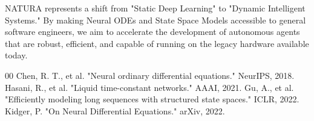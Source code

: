 \documentclass[journal]{IEEEtran}
\begin{document}
NATURA represents a shift from "Static Deep Learning" to "Dynamic Intelligent Systems." By making Neural ODEs and State Space Models accessible to general software engineers, we aim to accelerate the development of autonomous agents that are robust, efficient, and capable of running on the legacy hardware available today.


\begin{thebibliography}{00}
 Chen, R. T., et al. "Neural ordinary differential equations." NeurIPS, 2018.
 Hasani, R., et al. "Liquid time-constant networks." AAAI, 2021.
 Gu, A., et al. "Efficiently modeling long sequences with structured state spaces." ICLR, 2022.
 Kidger, P. "On Neural Differential Equations." arXiv, 2022.
\end{thebibliography}
\end{document}
